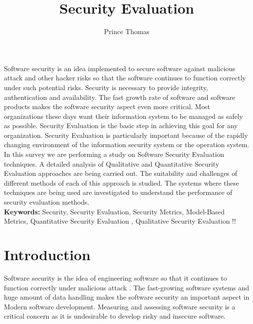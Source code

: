 \documentclass[pdftex,english,oribibl]{llncs}
\title{Security Evaluation}
\author{Prince Thomas}
\institute{University of Stuttgart\\Institute of Software Technology (ISTE)\\70569 Stuttgart, Germany}
\makeatletter
\gdef\@keywords{}
\renewenvironment{abstract}{%
  \list{}{\advance\topsep by0.35cm\relax\small%
          \leftmargin=1cm%
          \labelwidth=\z@%
          \listparindent=\z@%
          \itemindent\listparindent%
          \rightmargin\leftmargin}%
          \item[\hskip\labelsep\bfseries\abstractname]}{%
  \if!\@keywords!\else{\item[~]\item[\hskip\labelsep\bfseries\keywordname]\@keywords}\fi%
  \endlist}
\makeatother
\begin{document}
\maketitle

\begin{abstract}
Software security is an idea implemented to secure software against malicious attack and other hacker risks so that the software continues to function correctly under such potential risks. Security is necessary to provide integrity, authentication and availability. The fast growth rate of software and software products makes the software security aspect even more critical. Most organizations these days want their information system to be managed as safely as possible. Security Evaluation is the basic step in achieving this goal for any organization. Security Evaluation is particularly important because of the rapidly changing environment of the information security system or the operation system. In this survey we are performing a study on Software Security Evaluation techniques. A detailed analysis of Qualitative and Quantitative Security Evaluation approaches are being carried out. The suitability and challenges of different methods of each of this approach is studied. The systems where these techniques are being used are investigated to understand the performance of security evaluation methods.\\

\textbf{Keywords:} Security, Security Evaluation, Security Metrics, Model-Based Metrics, Quantitative Security Evaluation , Qualitative Security Evaluation
\end{abstract}


\section{Introduction}

  Software security is the idea of engineering software so that it continues to function correctly under malicious attack \cite{1281254_McGraw}. The fast-growing software systems and huge amount of data handling makes the software security an important aspect in Modern software development. Measuring and assessing software security is a critical concern as it is undesirable to develop risky and insecure software. 
  
\end{document}
